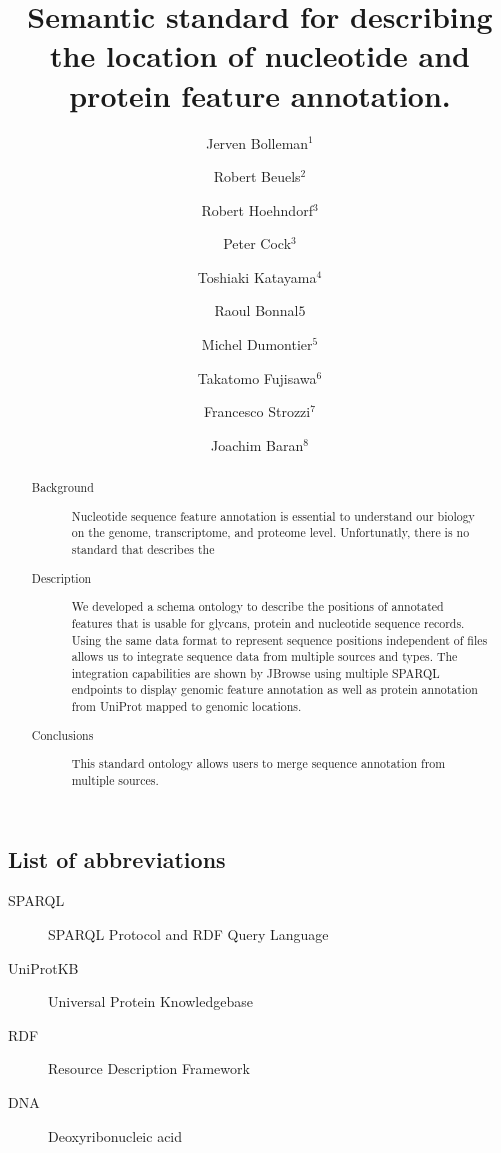 \documentclass[10pt]{bmc_article}
\newenvironment{bmcformat}{\begin{raggedright}\baselineskip20pt\sloppy\setboolean{publ}{false}}{\end{raggedright}\baselineskip20pt\sloppy}
\begin{document}
\begin{bmcformat}
\title{Semantic standard for describing the location of nucleotide and protein feature annotation.}
\author{Jerven Bolleman\correspondingauthor$^1$  
         \and Robert Beuels$^2$%
         \and Robert Hoehndorf$^3$%
         \and Peter Cock$^3$ %
		 \and Toshiaki Katayama$^4$ %
		 \and Raoul Bonnal$5$ %
		 \and Michel Dumontier$^5$ %
		 \and Takatomo Fujisawa$^6$ %
		 \and Francesco Strozzi$^7$ %
		 \and Joachim Baran$^8$ %
         }
\address{
    \iid(1)SIB Swiss Institute of Bioinformatics, Centre Medical Universitaire, 1 rue Michel
Servet, 1211 Geneva 4, Switzerland,
 \iid(2) fill in,
 \iid(3) James Hutton Institute, Invergowrie, Dundee DD2 5DA, UK,
 \iid(4) fill in,
 \iid(5) INGM,
 \iid(6) fill in,
 \iid(7) fill in, and
 \iid(8) fill in.
        }
\maketitle

\begin{abstract}
\begin{description}
\item[Background] Nucleotide sequence feature annotation is essential to understand our biology on the genome, transcriptome, and proteome level. Unfortunatly, there is no standard that describes the 
\item[Description] We developed a schema ontology to describe the positions of annotated features that is usable for glycans, protein and nucleotide sequence records.
Using the same data format to represent sequence positions independent of files allows us to integrate sequence data from multiple sources and types.
The integration capabilities are shown by JBrowse using multiple SPARQL endpoints to display genomic feature annotation as well as protein annotation from UniProt mapped to genomic locations.
\item[Conclusions] This standard ontology allows users to merge sequence annotation from multiple sources.
\end{description}
\end{abstract}

\section{List of abbreviations}
\begin{description}
\item[SPARQL] SPARQL Protocol and RDF Query Language
\item[UniProtKB] Universal Protein Knowledgebase 
\item[RDF] Resource Description Framework
\item[DNA] Deoxyribonucleic acid
\end{description}
\bigskip


\end{bmcformat}
\end{document}
